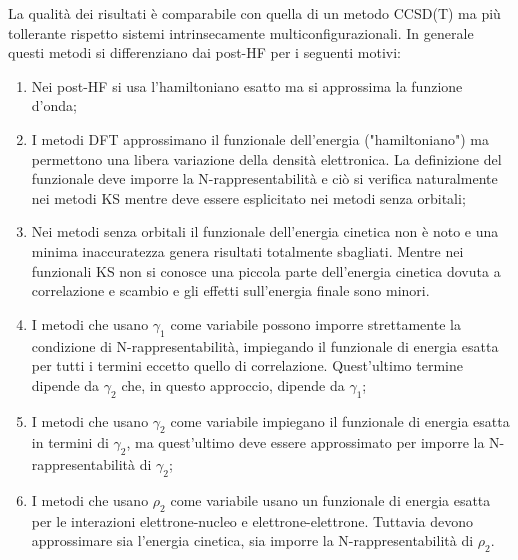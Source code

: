 \documentclass[oneside]{amsbook}
\numberwithin{section}{chapter}
\numberwithin{equation}{section}
\numberwithin{figure}{section}
\begin{document}
La qualità dei risultati è comparabile con quella di un metodo CCSD(T) ma più tollerante rispetto sistemi intrinsecamente multiconfigurazionali. 
In generale questi metodi si differenziano dai post-HF per i seguenti motivi:
\begin{enumerate}
\item Nei post-HF si usa l'hamiltoniano esatto ma si approssima la funzione d'onda;
\item I metodi DFT approssimano il funzionale dell'energia ("hamiltoniano") ma permettono una libera variazione della densità elettronica. La definizione del funzionale deve imporre la N-rappresentabilità e ciò si verifica naturalmente nei metodi KS mentre deve essere esplicitato nei metodi senza orbitali;
\item  Nei metodi senza orbitali il funzionale dell'energia cinetica non è noto e una minima inaccuratezza  genera risultati totalmente sbagliati. Mentre nei funzionali KS non si conosce una piccola parte dell'energia cinetica dovuta a correlazione e scambio e gli effetti sull'energia finale sono minori.
\item I metodi che usano $\gamma_1$ come variabile possono imporre strettamente la condizione di N-rappresentabilità, impiegando il funzionale di energia esatta per tutti i termini eccetto quello di correlazione. Quest'ultimo termine dipende da $\gamma_2$ che, in questo approccio, dipende da $\gamma_1$;
\item I metodi che usano $\gamma_2$ come variabile impiegano il funzionale di energia esatta in termini di $\gamma_2$, ma quest'ultimo deve essere approssimato per imporre la N-rappresentabilità di $\gamma_2$;
\item I metodi che usano $\rho_2$ come variabile usano un funzionale di energia esatta per le interazioni elettrone-nucleo e elettrone-elettrone. Tuttavia devono approssimare sia l'energia cinetica, sia imporre la N-rappresentabilità di $\rho_2$.
\end{enumerate}
\end{document}

